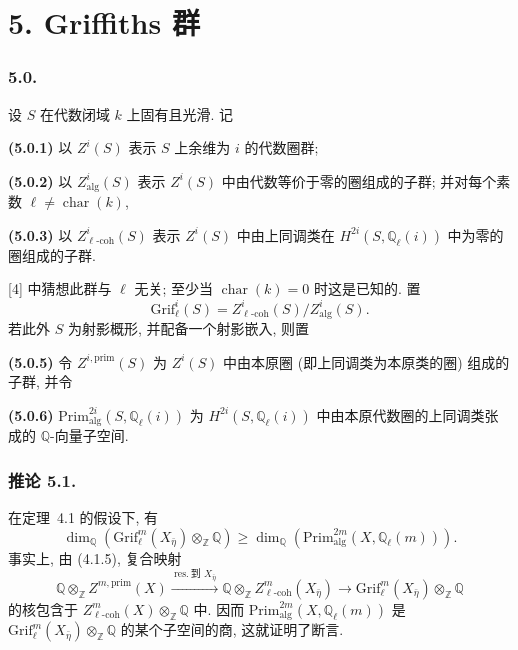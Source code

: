 \section*{5. Griffiths 群}

\subsubsection*{5.0.}
设 $S$ 在代数闭域 $k$ 上固有且光滑. 记

\medskip
\noindent\textbf{(5.0.1)} 以 $Z^i(S)$ 表示 $S$ 上余维为 $i$ 的代数圈群;

\noindent\textbf{(5.0.2)} 以 $Z^i_{\mathrm{alg}}(S)$ 表示 $Z^i(S)$ 中由代数等价于零的圈组成的子群; 并对每个素数 $\ell\ne\operatorname{char}(k)$,

\noindent\textbf{(5.0.3)} 以 $Z^i_{\ell\text{-}\mathrm{coh}}(S)$ 表示 $Z^i(S)$ 中由上同调类在 $H^{2i}(S,\mathbb Q_\ell(i))$ 中为零的圈组成的子群.

\textup{[4]} 中猜想此群与 $\ell$ 无关; 至少当 $\operatorname{char}(k)=0$ 时这是已知的. 置
\begin{equation}\tag{5.0.4}
\mathrm{Grif}^i_\ell(S)
 =Z^i_{\ell\text{-}\mathrm{coh}}(S)/Z^i_{\mathrm{alg}}(S).
\end{equation}
若此外 $S$ 为射影概形, 并配备一个射影嵌入, 则置

\medskip
\noindent\textbf{(5.0.5)} 令 $Z^{i,\mathrm{prim}}(S)$ 为 $Z^i(S)$ 中由本原圈 (即上同调类为本原类的圈) 组成的子群, 并令

\noindent\textbf{(5.0.6)}
$\mathrm{Prim}^{2i}_{\mathrm{alg}}(S,\mathbb Q_\ell(i))$ 为 $H^{2i}(S,\mathbb Q_\ell(i))$ 中由本原代数圈的上同调类张成的 $\mathbb Q$-向量子空间.

\subsubsection*{推论 5.1.}
在定理~4.1 的假设下, 有
\begin{equation}\tag{5.1.1}
\dim_{\mathbb Q}\!\left(
  \mathrm{Grif}^m_\ell(X_{\bar\eta})\otimes_{\mathbb Z}\mathbb Q
\right)
\geq
\dim_{\mathbb Q}\!\left(
  \mathrm{Prim}^{2m}_{\mathrm{alg}}(X,\mathbb Q_\ell(m))
\right).
\end{equation}
事实上, 由 (4.1.5), 复合映射
\begin{equation*}
\mathbb Q\otimes_{\mathbb Z}Z^{m,\mathrm{prim}}(X)
 \xrightarrow{\ \mathrm{res.}\ \text{到 }X_{\bar\eta}\ }
\mathbb Q\otimes_{\mathbb Z}Z^m_{\ell\text{-}\mathrm{coh}}
  (X_{\bar\eta})
 \longrightarrow \mathrm{Grif}^m_\ell(X_{\bar\eta})\otimes_{\mathbb Z}\mathbb Q
\end{equation*}
的核包含于 $Z^m_{\ell\text{-}\mathrm{coh}}(X)\otimes_{\mathbb Z}\mathbb Q$ 中. 因而 $\mathrm{Prim}^{2m}_{\mathrm{alg}}(X,\mathbb Q_\ell(m))$ 是 $\mathrm{Grif}^m_\ell(X_{\bar\eta})\otimes_{\mathbb Z}\mathbb Q$ 的某个子空间的商, 这就证明了断言.


